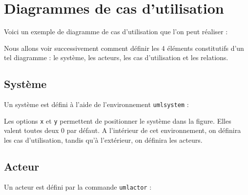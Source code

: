 \documentclass[a4paper,11pt]{report}
\newcommand{\inputTikZ}[1]{%
  }%
\newcommand{\inputTikZ}[1]{%
    \texttt{[image: fig/\#1.pdf]}%
  }%
\begin{document}
\chapter{Diagrammes de cas d'utilisation}\label{c.usecase}

Voici un exemple de diagramme de cas d'utilisation que l'on peut réaliser :

\begin{center}
\inputTikZ{usecaseex}
\end{center}

Nous allons voir successivement comment définir les 4 éléments constitutifs d'un tel diagramme : le système, les acteurs, les cas d'utilisation et les relations.

\section{Système}\label{s.system}

Un système est défini à l'aide de l'environnement {\tt umlsystem} :

\medskip

\begin{minipage}{0.6\textwidth}

\end{minipage}
\begin{minipage}{0.4\textwidth}
\begin{center}
\inputTikZ{figure41}
\end{center}
\end{minipage}

\medskip

Les options {\tt x} et {\tt y} permettent de positionner le système dans la figure. Elles valent toutes deux 0 par défaut. A l'intérieur de cet environnement, on définira les cas d'utilisation, tandis qu'à l'extérieur, on définira les acteurs.

\section{Acteur}\label{s.actor}

Un acteur est défini par la commande {\tt umlactor} :

\medskip

\begin{minipage}{0.6\textwidth}

\end{minipage}
\begin{minipage}{0.4\textwidth}
\begin{center}
\inputTikZ{figure42}
\end{center}
\end{minipage}
\end{document}
